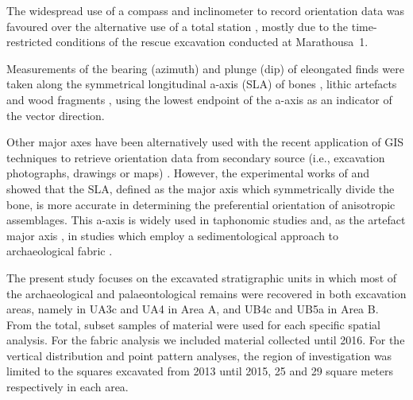 \documentclass[preprint,authoryear,times]{elsarticle} %
\begin{document}
The widespread use of a compass and inclinometer to record orientation data \citep[][among others]{Voorhies1969,Fiorillo1991,Bertran1995,Bertran1997,Lenoble2004,Eberth2007,Eren2010,Benito-Calvo2011a,Dominguez-Rodrigo2012,Dominguez-Rodrigo2013,Dominguez-Rodrigo2014,Cobo-Sanchez2014,Organista2017} was favoured over the alternative use of a total station \citep[][among others]{Kluskens1990,Dibble1997,McPherron2005,Enloe2006,Bernatchez2010}, mostly due to the time-restricted conditions of the rescue excavation conducted at Marathousa~1.

Measurements of the bearing (azimuth) and plunge (dip) of eleongated finds were taken along the symmetrical longitudinal a-axis (SLA) of bones \citep{Dominguez-Rodrigo2013}, lithic artefacts \citep{Bertran1995} and wood fragments \citep{Macdonald1985}, using the lowest endpoint of the a-axis as an indicator of the vector direction.

Other major axes have been alternatively used with the recent application of GIS techniques to retrieve orientation data from secondary source (i.e., excavation photographs, drawings or maps) \citep{Boschian2010,Benito-Calvo2011,Torre2013a,Walter2013,Garcia-Moreno2016,Sanchez-Romero2016}. %
However, the experimental works of \cite{Dominguez-Rodrigo2013} and \cite{Dominguez-Rodrigo2014} showed that the SLA, defined as the major axis which symmetrically divide the bone, is more accurate in determining the preferential orientation of anisotropic assemblages. This a-axis is widely used in taphonomic studies \citep[][among others]{Toots1965,Voorhies1969,Eberth2007,Dominguez-Rodrigo2012,Dominguez-Rodrigo2014c,Aramendi2017} and, as the artefact major axis \citep{Krumbein1941}, in studies which employ a sedimentological approach to archaeological fabric \citep[][among others]{Bertran1995,Bertran1997,Lenoble2004,Benito-Calvo2009}.

The present study focuses on the excavated stratigraphic units in which most of the archaeological and palaeontological remains were recovered in both excavation areas, namely in UA3c and UA4 in Area A, and UB4c and UB5a in Area B. From the total, subset samples of material were used for each specific spatial analysis. For the fabric analysis we included material collected until 2016. For the vertical distribution and point pattern analyses, the region of investigation was limited to the squares excavated from 2013 until 2015, 25 and 29 square meters respectively in each area.
\end{document}
